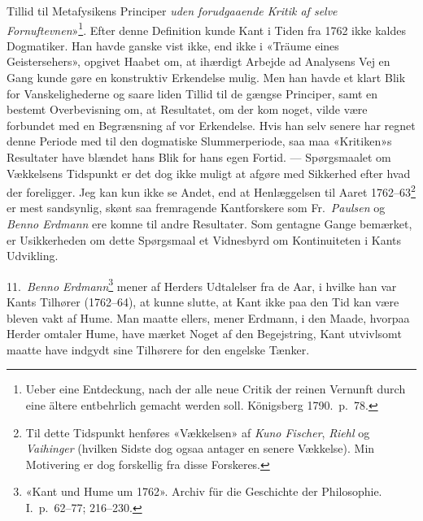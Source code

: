 \documentclass[12pt,a4paper]{article}
\newcommand{\apage}[1]{\marginnote{\footnotesize\textit{[#1]}}}
\begin{document}
Tillid til Metafysikens Principer \emph{uden forudgaaende Kritik af selve
Fornuftevnen}»\footnote{Ueber eine Entdeckung, nach der alle neue
Critik der reinen Vernunft durch eine ältere entbehrlich gemacht werden
soll. Königsberg 1790.\ p.\ 78.}. Efter denne Definition kunde Kant i
Tiden fra 1762 ikke kaldes Dogmatiker. Han havde ganske vist ikke, end
ikke i «Träume eines Geistersehers», opgivet Haabet om, at ihærdigt
Arbejde ad Analysens Vej en Gang kunde gøre en konstruktiv Erkendelse
mulig. Men han havde et klart Blik for Vanskelighederne og saare liden
Tillid til de gængse Principer, samt en bestemt Overbevisning om, at
Resultatet, om der kom noget, vilde være forbundet med en Begrænsning af
vor Erkendelse. Hvis han selv senere har regnet denne Periode med til den
dogmatiske Slummerperiode, saa maa «Kritiken»s Resultater have blændet
hans Blik for hans egen Fortid. --- Spørgsmaalet om Vækkelsens Tidspunkt
er det dog ikke muligt at afgøre med Sikkerhed efter hvad der foreligger.
Jeg kan kun ikke se Andet, end at Henlæggelsen til Aaret
1762--63\footnote{Til dette Tidspunkt henføres «Vækkelsen» af \emph{Kuno
Fischer}, \emph{Riehl} og \emph{Vaihinger} (hvilken Sidste dog ogsaa antager en senere
Vækkelse). Min Motivering er dog forskellig fra disse Forskeres.} er mest
sandsynlig, skønt saa fremragende Kantforskere som Fr.\ \emph{Paulsen} og \emph{Benno
Erdmann} ere komne \apage{24} til andre Resultater. Som gentagne Gange bemærket, er
Usikkerheden om dette Spørgsmaal et Vidnesbyrd om Kontinuiteten i Kants
Udvikling.

11.\ \emph{Benno Erdmann}\footnote{«Kant und Hume um 1762». Archiv für
die Geschichte der Philosophie. I.\ p.\ 62--77; 216--230.} mener af
Herders Udtalelser fra de Aar, i hvilke han var Kants Tilhører
(1762--64), at kunne slutte, at Kant ikke paa den Tid kan være bleven
vakt af Hume. Man maatte ellers, mener Erdmann, i den Maade, hvorpaa
Herder omtaler Hume, have mærket Noget af den Begejstring, Kant utvivlsomt
maatte have indgydt sine Tilhørere for den engelske Tænker.
\end{document}
